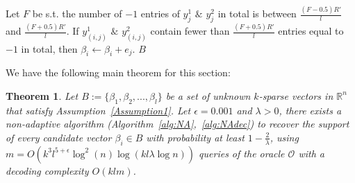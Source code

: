 \documentclass{article}
\newcommand\mc{\mathcal}
\newtheorem{theorem}{Theorem}[section]
\begin{document}
\begin{algorithm}
\begin{algorithmic}[1]
    \EndFor
    \begin{scriptsize}
    \end{scriptsize}
    \State Let $F$ be s.t. the number of $-1$ entries of $y_j^1$ $\&$ $y_j^2$ in total is between $\frac{(F-0.5)R'}{l}$ and $\frac{(F+0.5)R'}{l}$. 
    \State If $y_{(i,j)}^1$ $\&$ $y_{(i,j)}^2$ contain fewer than $\frac{(F+0.5)R'}{l}$ entries equal to $-1$ in total, then $\beta_i\leftarrow\beta_i+e_j$.
    \EndFor
    \State \Return $B$ 
\end{algorithmic}
\end{algorithm}

We have the following main theorem for this section: 

\begin{theorem}\label{thm3}
    Let $B:=\{\beta_1,\beta_2,...,\beta_l\}$ be a set of unknown $k$-sparse vectors in $\mathbb{R}^n$ that satisfy Assumption~\ref{Assumption1}. Let $\epsilon=0.001$ and $\lambda>0$,  there exists a non-adaptive algorithm (Algorithm~\ref{alg:NA},~\ref{alg:NAdec}) to recover the support of every candidate vector $\beta_i\in B$ with probability at least $1 - \frac{2}{\lambda}$, using $m=O(k^3l^{5+\epsilon}\log^2(n)\log(kl\lambda\log n))$ queries of the oracle $\mc{O}$ with a decoding complexity $O(klm)$. 
\end{theorem}



\end{document}
